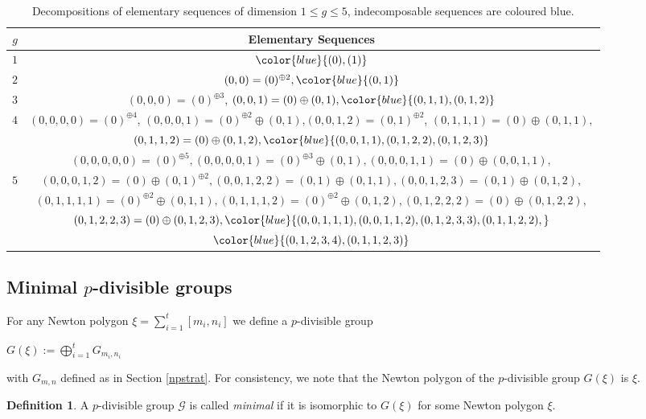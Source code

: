 \documentclass[11pt,table]{amsart}
\numberwithin{equation}{section}
\theoremstyle{definition}
\newtheorem{defn}[thm]{Definition}
\theoremstyle{remark}
\theoremstyle{remark}
\begin{document}
\begin{table}
\centering
    \begin{tabular}{|c|c|}
    \hline
   $g$  & Elementary Sequences \\ \hline 
   $1$ & $ \color{blue}{(0), (1)}$  \\ \hline 
   $2$   & $(0,0) = (0)^{\oplus 2}, \color{blue}{(0,1)}$  \\ \hline 

   $3$   & $(0,0,0) = (0)^{\oplus 3}$, $(0,0,1) = (0) \oplus (0,1), \color{blue}{(0,1,1),(0,1,2)} $   \\ \hline     
         $4$    & $(0,0,0,0) = (0)^{\oplus 4}$, $(0,0,0,1) = (0)^{\oplus 2} \oplus (0,1) $,$(0,0,1,2) = (0,1)^{\oplus 2}$, $(0,1,1,1) = (0) \oplus (0,1,1),$  \\

         &$(0,1,1,2) = (0) \oplus (0,1,2), \color{blue}{(0,0,1,1), (0,1,2,2), (0,1,2,3)} $ \\ \hline  
    
           & $(0,0,0,0,0) = (0)^{\oplus 5}, (0,0,0,0,1) = (0)^{\oplus 3} \oplus (0,1), (0,0,0,1,1) = (0) \oplus (0,0,1,1), $    \\ 
    $5$       & $(0,0,0,1,2) = (0) \oplus (0,1)^{\oplus 2}, (0,0,1,2,2) = (0,1) \oplus (0,1,1), (0,0,1,2,3) = (0,1) \oplus (0,1,2),   $ \\
           & $(0,1,1,1,1) = (0)^{\oplus 2} \oplus (0,1,1),(0,1,1,1,2) = (0)^{\oplus 2} \oplus (0,1,2), (0,1,2,2,2) = (0) \oplus (0,1,2,2),$  \\
           & $ (0,1,2,2,3) = (0) \oplus (0,1,2,3), \color{blue}{(0,0,1,1,1), (0,0,1,1,2), (0,1,2,3,3), (0,1,1,2,2),}$ \\ 
           & $ \color{blue}{(0,1,2,3,4), (0,1,1,2,3)}$ \\ \hline 
  \end{tabular}
      \caption{ Decompositions of elementary sequences of dimension $ 1 \le g \le 5$, indecomposable sequences are coloured blue.}
    \label{additions}
    \end{table}

\subsection{Minimal $p$-divisible groups}

For any Newton polygon $ \xi = \displaystyle \sum_{i=1}^{t} [m_{i}, n_{i}]$ we define a $p$-divisible group 
\begin{center}
    $G(\xi) :=  \displaystyle \bigoplus_{i=1}^{t} G_{m_{i},n_{i}}$
\end{center}
with $G_{m,n}$ defined as in Section \ref{npstrat}. For consistency, we note that the Newton polygon of the $p$-divisible group $G ( \xi)$ is  $\xi$. 
\begin{defn}
  A $p$-divisible group $\mathcal{G}$ is called \textit{minimal} if it is isomorphic to $G(\xi)$ for some Newton polygon $\xi$. 
\end{defn}
\end{document}
